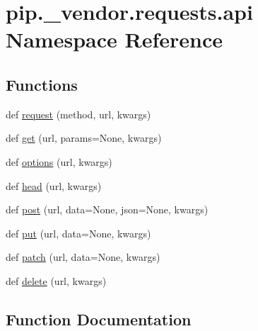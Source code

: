 \hypertarget{namespacepip_1_1__vendor_1_1requests_1_1api}{}\section{pip.\+\_\+vendor.\+requests.\+api Namespace Reference}
\label{namespacepip_1_1__vendor_1_1requests_1_1api}
\subsection*{Functions}
\begin{DoxyCompactItemize}
\item 
def \hyperlink{namespacepip_1_1__vendor_1_1requests_1_1api_a7b51e66340bead9a75bffec33d6e5aa7}{request} (method, url, kwargs)
\item 
def \hyperlink{namespacepip_1_1__vendor_1_1requests_1_1api_aaa016377aa5f06966ba79856f8335448}{get} (url, params=None, kwargs)
\item 
def \hyperlink{namespacepip_1_1__vendor_1_1requests_1_1api_a3e92ef5a4bb0ded15ebae698682cd298}{options} (url, kwargs)
\item 
def \hyperlink{namespacepip_1_1__vendor_1_1requests_1_1api_ac1ce0a9e379ea4d408a70dbef26636d7}{head} (url, kwargs)
\item 
def \hyperlink{namespacepip_1_1__vendor_1_1requests_1_1api_a5aad530da4fa87d1dd81f6023b1e0cd6}{post} (url, data=None, json=None, kwargs)
\item 
def \hyperlink{namespacepip_1_1__vendor_1_1requests_1_1api_ac828574a7bbadca5580cf93c1145e99b}{put} (url, data=None, kwargs)
\item 
def \hyperlink{namespacepip_1_1__vendor_1_1requests_1_1api_ad06473c4ed3671afd03c5726cfad05fa}{patch} (url, data=None, kwargs)
\item 
def \hyperlink{namespacepip_1_1__vendor_1_1requests_1_1api_aa55dadb06bfe6cdcd0154858f67e2f81}{delete} (url, kwargs)
\end{DoxyCompactItemize}


\subsection{Function Documentation}
\mbox{\label{namespacepip_1_1__vendor_1_1requests_1_1api_aa55dadb06bfe6cdcd0154858f67e2f81}} 
